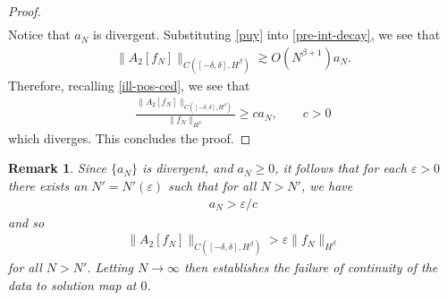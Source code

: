 \documentclass[12pt,reqno]{amsart}
\numberwithin{equation}{section}  %
\newcommand{\ee}{\varepsilon}
\newtheorem{remark}[theorem]{Remark}
\begin{document}
\begin{proof}
\begin{equation*}
\begin{split}
\end{split}
\end{equation*}
%
%
Notice that $a_{N}$ is divergent. Substituting \eqref{puy} into \eqref{pre-int-decay}, we see that 
%
%
\begin{equation*}
\begin{split}
\|A_{2}[f_{N}]\|_{C( [-\delta, \delta], H^{\beta})}
   \gtrsim O(N^{\beta+1}) a_{N}.
\end{split}
\end{equation*}
%
Therefore, recalling \eqref{ill-pos-ced}, we see that
%
%
\begin{equation*}
\begin{split}
\frac{\|A_{2}[f_{N}]\|_{C( [-\delta, \delta], H^{\beta})}}{\| f_{N}
\|_{H^{\beta}}} \ge c a_{N}, \qquad c > 0 
\end{split}
\end{equation*}
%
%
which diverges. This concludes the proof.
%
%

%
%
%
\end{proof}
%
%
\begin{framed}
\begin{remark}
 Since $\{a_{N}\}$ is divergent, and $a_{N} \ge 0$, it follows that for each $\ee > 0$ there exists an $N' = N'(\ee)$ such that for all $N > N'$, we have
  \begin{equation*}
  \begin{split}
    a_{N} > \ee/c
  \end{split}
  \end{equation*}
  and so
  \begin{equation*}
  \begin{split}
  \|A_{2}[f_{N}]\|_{C( [-\delta, \delta], H^{\beta})}
  > \ee {\| f_{N} \|_{H^{\beta}}}
  \end{split}
  \end{equation*}
  for all $N > N'$. Letting $N \to \infty$ then establishes the failure of continuity of the data to solution map at $0$.  
\label{rem:calc}
\end{remark}
\end{framed}
%
%
%
%
%
\end{document}

